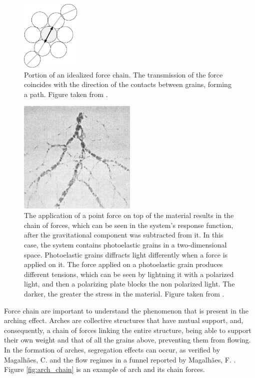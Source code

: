 \begin{figure}
    \centering
    \includegraphics[width=0.25\textwidth]{04-figuras/Force_Chain_Pathway.png}
    \caption[Pahtway of force chain.]{Portion of an idealized force chain. The transmission of the force coincides with the direction of the contacts between grains, forming a path. Figure taken from \cite{Characterization_of_force_chains_in_granular_material}.}
    \label{fig:pathway_chain}
\end{figure}

\begin{figure}
    \centering
    \includegraphics[width=0.5\textwidth]{04-figuras/Cadeia_Forca.png}
    \caption[Example of force chain.]{The application of a point force on top of the material results in the chain of forces, which can be seen in the system's response function, after the gravitational component was subtracted from it. In this case, the system contains photoelastic grains in a two-dimensional space. Photoelastic grains diffracts light differently when a force is applied on it. The force applied on a photoelastic grain produces different tensions, which can be seen by lightning it with a polarized light, and then a polarizing plate blocks the non polarized light. The darker, the greater the stress in the material. Figure taken from \cite{Sensitivity_of_Stress_Response_Function_to_Packing_Preparation}.}
    \label{fig:force_chain}
\end{figure}

    Force chain are important to understand the phenomenon that is present in the arching effect. Arches are collective structures that have mutual support, and, consequently, a chain of forces linking the entire structure, being able to support their own weight and that of all the grains above, preventing them from flowing. In the formation of arches, segregation effects can occur, as verified by Magalhães, C. \cite{Caio-Tese} and the flow regimes in a funnel reported by Magalhães, F. \cite{Felipe-Tese}. Figure \ref{fig:arch_chain} is an example of arch and its chain forces.

